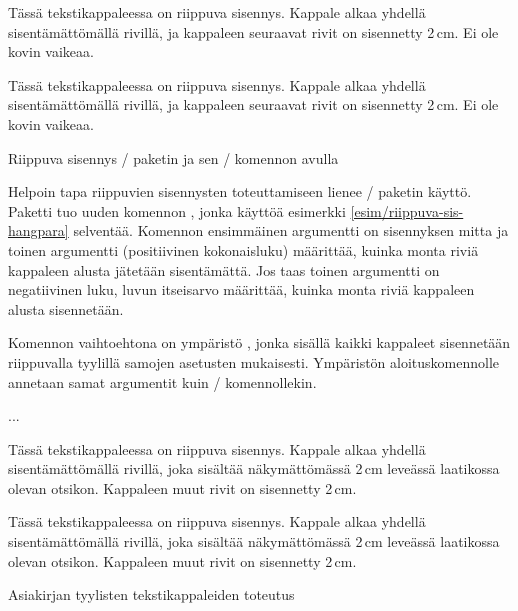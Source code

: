 \begin{esimerkki*}
  \komentoi{,}

\begin{koodilohko}
Tässä tekstikappaleessa on riippuva sisennys. Kappale
alkaa yhdellä sisentämättömällä rivillä, ja kappaleen seuraavat rivit
on sisennetty 2\,cm. Ei ole kovin vaikeaa.
\end{koodilohko}
  \begin{tulos}
    Tässä tekstikappaleessa on riippuva sisennys. Kappale
    alkaa yhdellä sisentämättömällä rivillä, ja kappaleen seuraavat rivit
    on sisennetty 2\,cm. Ei ole kovin vaikeaa.
  \end{tulos}
  \caption{Riippuva sisennys \-/ paketin ja sen
    \-/ komennon avulla}
  \label{esim/riippuva-sis-hangpara}
\end{esimerkki*}

Helpoin tapa riippuvien sisennysten toteuttamiseen lienee
\-/ paketin käyttö. Paketti tuo uuden komennon
, jonka käyttöä esimerkki
\ref{esim/riippuva-sis-hangpara} selventää. Komennon ensimmäinen
argumentti on sisennyksen mitta ja toinen argumentti (positiivinen
kokonaisluku) määrittää, kuinka monta riviä kappaleen alusta jätetään
sisentämättä. Jos taas toinen argumentti on negatiivinen luku, luvun
itseisarvo määrittää, kuinka monta riviä kappaleen alusta sisennetään.

Komennon  vaihtoehtona on ympäristö
, jonka sisällä kaikki kappaleet sisennetään
riippuvalla tyylillä samojen asetusten mukaisesti. Ympäristön
aloituskomennolle annetaan samat argumentit kuin \-/
komennollekin.

\begin{koodilohkosis}
\begin{hangparas}{2cm}{1}
  ...
\end{hangparas}
\end{koodilohkosis}

\begin{esimerkki*}
  \komentoi{,}

\begin{koodilohko}
Tässä tekstikappaleessa on
riippuva sisennys. Kappale alkaa yhdellä sisentämättömällä rivillä,
joka sisältää näkymättömässä 2\,cm leveässä laatikossa olevan otsikon.
Kappaleen muut rivit on sisennetty 2\,cm.
\end{koodilohko}
  \begin{tulos}
    Tässä tekstikappaleessa on
    riippuva sisennys. Kappale alkaa yhdellä sisentämättömällä rivillä,
    joka sisältää näkymättömässä 2\,cm leveässä laatikossa olevan otsikon.
    Kappaleen muut rivit on sisennetty 2\,cm.
  \end{tulos}
  \caption{Asiakirjan tyylisten tekstikappaleiden toteutus}
  \label{esim/riippuva-sis-asiakirja}
\end{esimerkki*}

